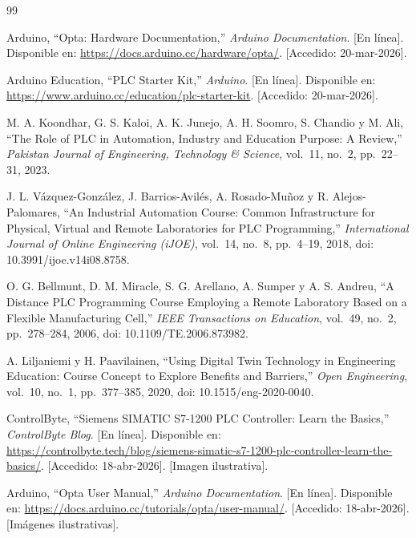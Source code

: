 \documentclass[12pt,a4paper,oneside]{report}
\begin{document}
\begin{thebibliography}{99}

Arduino, ``Opta: Hardware Documentation,'' \emph{Arduino Documentation}. [En línea]. Disponible en: \url{https://docs.arduino.cc/hardware/opta/}. [Accedido: 20-mar-2026].

Arduino Education, ``PLC Starter Kit,'' \emph{Arduino}. [En línea]. Disponible en: \url{https://www.arduino.cc/education/plc-starter-kit}. [Accedido: 20-mar-2026].

M. A. Koondhar, G. S. Kaloi, A. K. Junejo, A. H. Soomro, S. Chandio y M. Ali, ``The Role of PLC in Automation, Industry and Education Purpose: A Review,'' \emph{Pakistan Journal of Engineering, Technology \& Science}, vol.~11, no.~2, pp.~22--31, 2023.

J. L. Vázquez-González, J. Barrios-Avilés, A. Rosado-Muñoz y R. Alejos-Palomares, ``An Industrial Automation Course: Common Infrastructure for Physical, Virtual and Remote Laboratories for PLC Programming,'' \emph{International Journal of Online Engineering (iJOE)}, vol.~14, no.~8, pp.~4--19, 2018, doi: 10.3991/ijoe.v14i08.8758.

O. G. Bellmunt, D. M. Miracle, S. G. Arellano, A. Sumper y A. S. Andreu, ``A Distance PLC Programming Course Employing a Remote Laboratory Based on a Flexible Manufacturing Cell,'' \emph{IEEE Transactions on Education}, vol.~49, no.~2, pp.~278--284, 2006, doi: 10.1109/TE.2006.873982.

A. Liljaniemi y H. Paavilainen, ``Using Digital Twin Technology in Engineering Education: Course Concept to Explore Benefits and Barriers,'' \emph{Open Engineering}, vol.~10, no.~1, pp.~377--385, 2020, doi: 10.1515/eng-2020-0040.

ControlByte, ``Siemens SIMATIC S7-1200 PLC Controller: Learn the Basics,'' \emph{ControlByte Blog}. [En línea]. Disponible en: \url{https://controlbyte.tech/blog/siemens-simatic-s7-1200-plc-controller-learn-the-basics/}. [Accedido: 18-abr-2026]. [Imagen ilustrativa].

Arduino, ``Opta User Manual,'' \emph{Arduino Documentation}. [En línea]. Disponible en: \url{https://docs.arduino.cc/tutorials/opta/user-manual/}. [Accedido: 18-abr-2026]. [Imágenes ilustrativas].


\end{thebibliography}
\end{document}

